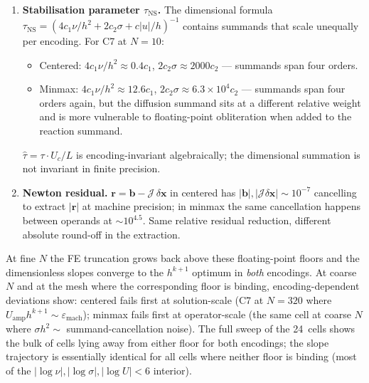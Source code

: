 \documentclass[11pt]{article}
\begin{document}
\begin{enumerate}
      Both encodings produce the same dimensionless $\hat{\boldsymbol{\pi}}_h$
      \emph{exactly} (the dimensional rescaling cancels term by term),
      but the round-off in computing the dimensional $R$ as a sum of
      four contributions at different magnitudes accumulates
      differently. The relative position of summands in log-space
      changes between encodings, and Float64 cancels the smaller
      ones differently when summed with the larger ones.
\item \textbf{Stabilisation parameter $\tau_{\text{NS}}$.} The
      dimensional formula
      $\tau_{\text{NS}} = (4 c_1 \nu / h^2 + 2 c_2 \sigma + c |u|/h)^{-1}$
      contains summands that scale unequally per encoding. For C7 at
      $N=10$:
      \begin{itemize}
      \item Centered: $4 c_1 \nu / h^2 \approx 0.4 c_1$, $2 c_2 \sigma \approx 2000 c_2$ — summands span four orders.
      \item Minmax:   $4 c_1 \nu / h^2 \approx 12.6 c_1$, $2 c_2 \sigma \approx 6.3 \times 10^4 c_2$ — summands span four orders again, but the diffusion summand sits at a different relative weight and is more vulnerable to floating-point obliteration when added to the reaction summand.
      \end{itemize}
      $\hat{\tau} = \tau \cdot U_c / L$ is encoding-invariant
      algebraically; the dimensional summation is not invariant in
      finite precision.
\item \textbf{Newton residual.} $\boldsymbol{r} = \boldsymbol{b} -
      \mathcal{J}\, \delta\boldsymbol{x}$ in centered has
      $|\boldsymbol{b}|, |\mathcal{J} \delta\boldsymbol{x}| \sim 10^{-7}$
      cancelling to extract $|\boldsymbol{r}|$ at machine precision; in
      minmax the same cancellation happens between operands at $\sim
      10^{4.5}$. Same relative residual reduction, different absolute
      round-off in the extraction.
\end{enumerate}

\noindent At fine $N$ the FE truncation grows back above these
floating-point floors and the dimensionless slopes converge to the
$h^{k+1}$ optimum in \emph{both} encodings. At coarse $N$ and at the
mesh where the corresponding floor is binding, encoding-dependent
deviations show: centered fails first at solution-scale (C7 at $N=320$
where $U_{\text{amp}} h^{k+1} \sim \varepsilon_{\text{mach}}$); minmax
fails first at operator-scale (the same cell at coarse $N$ where
$\sigma h^2 \sim$ summand-cancellation noise). The full sweep of the
24~cells shows the bulk of cells lying away from either floor for both
encodings; the slope trajectory is essentially identical for all cells
where neither floor is binding (most of the
$|\log\nu|, |\log\sigma|, |\log U| < 6$ interior).
\end{document}
